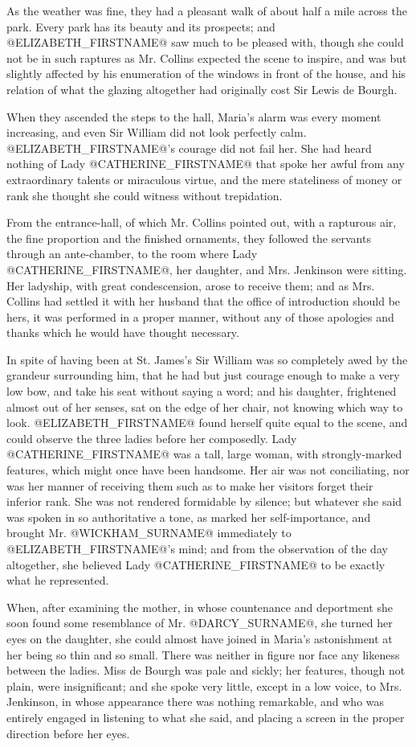 As the weather was fine, they had a pleasant walk of about half a
mile across the park. Every park has its beauty and its prospects; and
@ELIZABETH_FIRSTNAME@ saw much to be pleased with, though she could not be in such
raptures as Mr. Collins expected the scene to inspire, and was but
slightly affected by his enumeration of the windows in front of the
house, and his relation of what the glazing altogether had originally
cost Sir Lewis de Bourgh.

When they ascended the steps to the hall, Maria's alarm was every
moment increasing, and even Sir William did not look perfectly calm.
@ELIZABETH_FIRSTNAME@'s courage did not fail her. She had heard nothing of Lady
@CATHERINE_FIRSTNAME@ that spoke her awful from any extraordinary talents or
miraculous virtue, and the mere stateliness of money or rank she thought
she could witness without trepidation.

From the entrance-hall, of which Mr. Collins pointed out, with a
rapturous air, the fine proportion and the finished ornaments, they
followed the servants through an ante-chamber, to the room where Lady
@CATHERINE_FIRSTNAME@, her daughter, and Mrs. Jenkinson were sitting. Her ladyship,
with great condescension, arose to receive them; and as Mrs. Collins had
settled it with her husband that the office of introduction should
be hers, it was performed in a proper manner, without any of those
apologies and thanks which he would have thought necessary.

In spite of having been at St. James's Sir William was so completely
awed by the grandeur surrounding him, that he had but just courage
enough to make a very low bow, and take his seat without saying a word;
and his daughter, frightened almost out of her senses, sat on the edge
of her chair, not knowing which way to look. @ELIZABETH_FIRSTNAME@ found herself
quite equal to the scene, and could observe the three ladies before her
composedly. Lady @CATHERINE_FIRSTNAME@ was a tall, large woman, with strongly-marked
features, which might once have been handsome. Her air was not
conciliating, nor was her manner of receiving them such as to make her
visitors forget their inferior rank. She was not rendered formidable by
silence; but whatever she said was spoken in so authoritative a tone,
as marked her self-importance, and brought Mr. @WICKHAM_SURNAME@ immediately to
@ELIZABETH_FIRSTNAME@'s mind; and from the observation of the day altogether, she
believed Lady @CATHERINE_FIRSTNAME@ to be exactly what he represented.

When, after examining the mother, in whose countenance and deportment
she soon found some resemblance of Mr. @DARCY_SURNAME@, she turned her eyes on the
daughter, she could almost have joined in Maria's astonishment at her
being so thin and so small. There was neither in figure nor face any
likeness between the ladies. Miss de Bourgh was pale and sickly; her
features, though not plain, were insignificant; and she spoke very
little, except in a low voice, to Mrs. Jenkinson, in whose appearance
there was nothing remarkable, and who was entirely engaged in listening
to what she said, and placing a screen in the proper direction before
her eyes.

